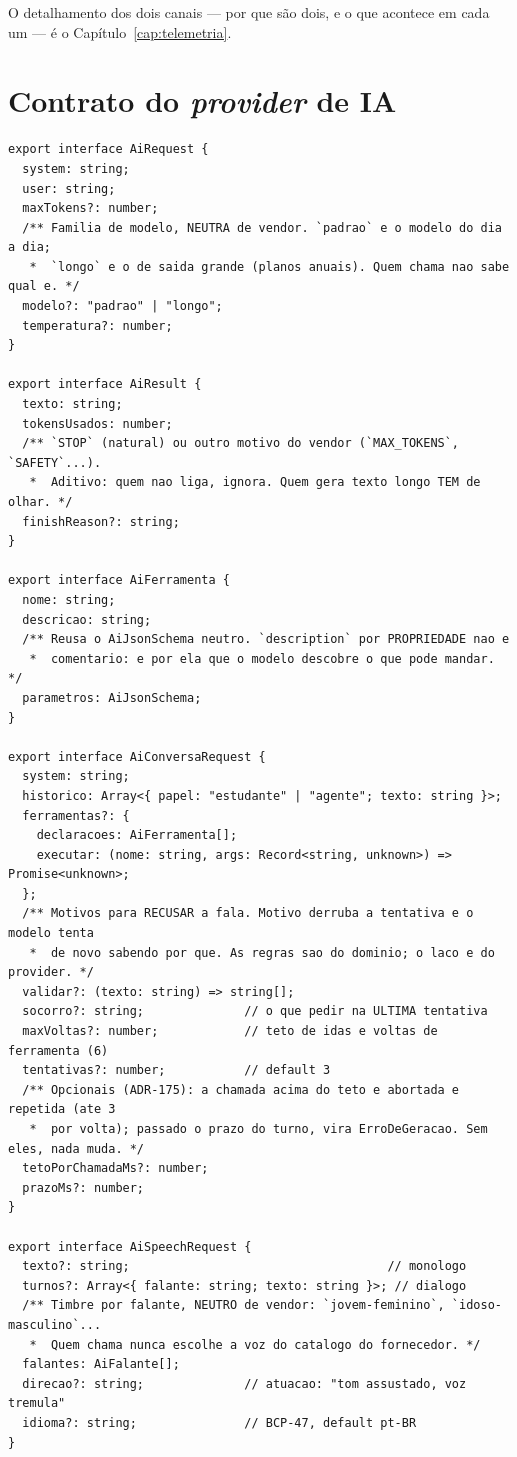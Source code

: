 O detalhamento dos dois canais --- por que são dois, e o que acontece em cada um
--- é o Capítulo~\ref{cap:telemetria}.

\section{Contrato do \emph{provider} de IA}

\begin{lstlisting}[language=tsunoo, caption={\arq{apps/api/src/ai/provider.ts} --- a interface neutra de \emph{vendor}}, label={lst:aiprovider}]
export interface AiRequest {
  system: string;
  user: string;
  maxTokens?: number;
  /** Familia de modelo, NEUTRA de vendor. `padrao` e o modelo do dia a dia;
   *  `longo` e o de saida grande (planos anuais). Quem chama nao sabe qual e. */
  modelo?: "padrao" | "longo";
  temperatura?: number;
}

export interface AiResult {
  texto: string;
  tokensUsados: number;
  /** `STOP` (natural) ou outro motivo do vendor (`MAX_TOKENS`, `SAFETY`...).
   *  Aditivo: quem nao liga, ignora. Quem gera texto longo TEM de olhar. */
  finishReason?: string;
}

export interface AiFerramenta {
  nome: string;
  descricao: string;
  /** Reusa o AiJsonSchema neutro. `description` por PROPRIEDADE nao e
   *  comentario: e por ela que o modelo descobre o que pode mandar. */
  parametros: AiJsonSchema;
}

export interface AiConversaRequest {
  system: string;
  historico: Array<{ papel: "estudante" | "agente"; texto: string }>;
  ferramentas?: {
    declaracoes: AiFerramenta[];
    executar: (nome: string, args: Record<string, unknown>) => Promise<unknown>;
  };
  /** Motivos para RECUSAR a fala. Motivo derruba a tentativa e o modelo tenta
   *  de novo sabendo por que. As regras sao do dominio; o laco e do provider. */
  validar?: (texto: string) => string[];
  socorro?: string;              // o que pedir na ULTIMA tentativa
  maxVoltas?: number;            // teto de idas e voltas de ferramenta (6)
  tentativas?: number;           // default 3
  /** Opcionais (ADR-175): a chamada acima do teto e abortada e repetida (ate 3
   *  por volta); passado o prazo do turno, vira ErroDeGeracao. Sem eles, nada muda. */
  tetoPorChamadaMs?: number;
  prazoMs?: number;
}

export interface AiSpeechRequest {
  texto?: string;                                    // monologo
  turnos?: Array<{ falante: string; texto: string }>; // dialogo
  /** Timbre por falante, NEUTRO de vendor: `jovem-feminino`, `idoso-masculino`...
   *  Quem chama nunca escolhe a voz do catalogo do fornecedor. */
  falantes: AiFalante[];
  direcao?: string;              // atuacao: "tom assustado, voz tremula"
  idioma?: string;               // BCP-47, default pt-BR
}


\end{lstlisting}
